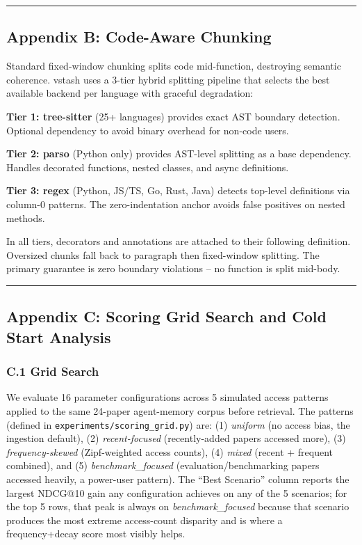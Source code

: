 \documentclass[
  11pt]{article}
\begin{document}
\begin{center}\rule{0.5\linewidth}{0.5pt}\end{center}

\subsection{Appendix B: Code-Aware Chunking}\label{appendix-b-code-aware-chunking}

Standard fixed-window chunking splits code mid-function, destroying semantic coherence. vstash uses a 3-tier hybrid splitting pipeline that selects the best available backend per language with graceful degradation:

\textbf{Tier 1: tree-sitter} (25+ languages) provides exact AST boundary detection. Optional dependency to avoid binary overhead for non-code users.

\textbf{Tier 2: parso} (Python only) provides AST-level splitting as a base dependency. Handles decorated functions, nested classes, and async definitions.

\textbf{Tier 3: regex} (Python, JS/TS, Go, Rust, Java) detects top-level definitions via column-0 patterns. The zero-indentation anchor avoids false positives on nested methods.

In all tiers, decorators and annotations are attached to their following definition. Oversized chunks fall back to paragraph then fixed-window splitting. The primary guarantee is zero boundary violations -- no function is split mid-body.

\begin{center}\rule{0.5\linewidth}{0.5pt}\end{center}

\subsection{Appendix C: Scoring Grid Search and Cold Start Analysis}\label{appendix-c-scoring-grid-search-and-cold-start-analysis}

\subsubsection{C.1 Grid Search}\label{c.1-grid-search}

We evaluate 16 parameter configurations across 5 simulated access patterns applied to the same 24-paper agent-memory corpus before retrieval. The patterns (defined in \texttt{experiments/scoring\_grid.py}) are: (1) \emph{uniform} (no access bias, the ingestion default), (2) \emph{recent-focused} (recently-added papers accessed more), (3) \emph{frequency-skewed} (Zipf-weighted access counts), (4) \emph{mixed} (recent + frequent combined), and (5) \emph{benchmark\_focused} (evaluation/benchmarking papers accessed heavily, a power-user pattern). The ``Best Scenario'' column reports the largest NDCG@10 gain any configuration achieves on any of the 5 scenarios; for the top 5 rows, that peak is always on \emph{benchmark\_focused} because that scenario produces the most extreme access-count disparity and is where a frequency+decay score most visibly helps.
\end{document}
